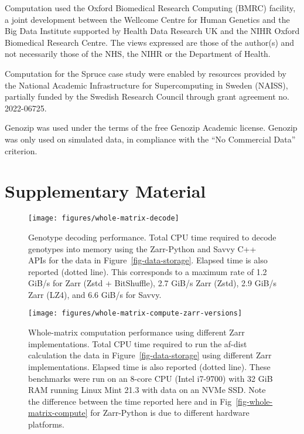 \documentclass[a4paper,num-refs]{oup-contemporary}
\begin{document}
Computation used the Oxford Biomedical Research Computing (BMRC) facility, a
joint development between the Wellcome Centre for Human Genetics and the Big
Data Institute supported by Health Data Research UK and the NIHR Oxford
Biomedical Research Centre. The views expressed are those of the author(s) and
not necessarily those of the NHS, the NIHR or the Department of Health.

Computation for the Spruce case study were enabled by resources
provided by the National Academic Infrastructure for Supercomputing in
Sweden (NAISS), partially funded by the Swedish Research Council
through grant agreement no. 2022-06725.

Genozip was used under the terms of the free Genozip Academic license.
Genozip was only used on simulated data, in compliance with
the ``No Commercial Data'' criterion.



\renewcommand\thefigure{S\arabic{figure}}
\setcounter{figure}{0}
\renewcommand\thetable{S\arabic{table}}
\setcounter{table}{0}

\section*{Supplementary Material}

\begin{figure}[h]
\texttt{[image: figures/whole-matrix-decode]}
\caption{Genotype decoding performance.
Total CPU time required to decode genotypes into memory using the Zarr-Python
and Savvy C++ APIs for the data in Figure~\ref{fig-data-storage}.
Elapsed time is also reported (dotted line).
This corresponds to a maximum rate of 1.2 GiB/s for Zarr (Zstd + BitShuffle),
2.7 GiB/s Zarr (Zstd), 2.9 GiB/s Zarr (LZ4), and 6.6 GiB/s for Savvy.
\label{fig-whole-matrix-decode}}
\end{figure}

\begin{figure}[h]
\texttt{[image: figures/whole-matrix-compute-zarr-versions]}
\caption{Whole-matrix computation performance using different Zarr
implementations.
Total CPU time required to run the af-dist calculation
the data in Figure~\ref{fig-data-storage} using different Zarr implementations.
Elapsed time is also reported (dotted line).
These benchmarks were run on an 8-core CPU (Intel i7-9700) with 32 GiB RAM running
Linux Mint 21.3 with data on an NVMe SSD.
Note the difference between the
time reported here and in Fig~\ref{fig-whole-matrix-compute} for Zarr-Python
is due to different hardware platforms.
\label{fig-whole-matrix-compute-zarr-versions}}
\end{figure}
\end{document}
